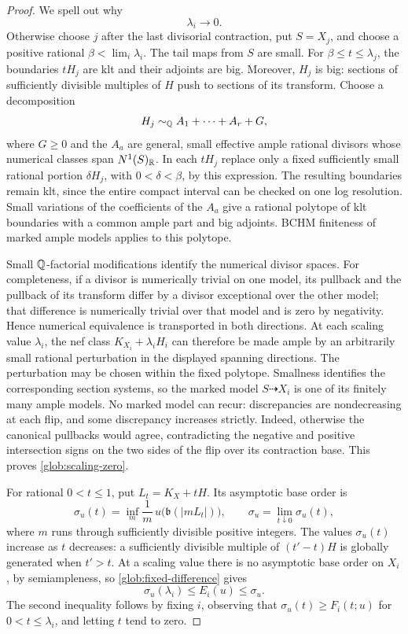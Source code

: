 \begin{proof}
We spell out why
\begin{equation}\label{glob:scaling-zero}
 \lambda_i\longrightarrow0.
\end{equation}
Otherwise choose $j$ after the last divisorial contraction, put $S=X_j$,
and choose a positive rational $\beta<\lim_i\lambda_i$.  The tail maps
from $S$ are small.  For $\beta\leq t\leq\lambda_j$, the boundaries $tH_j$
are klt and their adjoints are big.  Moreover, $H_j$ is big: sections of
sufficiently divisible multiples of $H$ push to sections of its transform.
Choose a decomposition
\[
 H_j\sim_\mathbb Q A_1+\cdots+A_r+G,
\]
where $G\geq0$ and the $A_a$ are general, small effective ample rational
divisors whose numerical classes span $N^1(S)_\mathbb R$.  In each $tH_j$ replace
only a fixed sufficiently small rational portion $\delta H_j$, with
$0<\delta<\beta$, by this expression.  The resulting boundaries remain
klt, since the entire compact interval can be checked on one log
resolution.  Small variations of the coefficients of the $A_a$ give a
rational polytope of klt boundaries with a common ample part and big
adjoints.  BCHM finiteness of marked ample models
\cite[Corollary~1.1.5]{BCHM} applies to this polytope.

Small $\mathbb Q$-factorial modifications identify the numerical divisor spaces.
For completeness, if a divisor is numerically trivial on one model, its
pullback and the pullback of its transform differ by a divisor exceptional
over the other model; that difference is numerically trivial over that
model and is zero by negativity.  Hence numerical equivalence is
transported in both directions.  At each scaling value $\lambda_i$, the
nef class $K_{X_i}+\lambda_iH_i$ can therefore be made ample by an
arbitrarily small rational perturbation in the displayed spanning
directions.  The perturbation may be chosen within the fixed polytope.
Smallness identifies the corresponding section systems, so the marked
model $S\dashrightarrow X_i$ is one of its finitely many ample models.
No marked model can recur: discrepancies are nondecreasing at each flip,
and some discrepancy increases strictly.  Indeed, otherwise the canonical
pullbacks would agree, contradicting the negative and positive
intersection signs on the two sides of the flip over its contraction
base.  This proves \eqref{glob:scaling-zero}.

For rational $0<t\leq1$, put $L_t=K_X+tH$.  Its asymptotic base order is
\[
 \sigma_u(t)=\inf_m\frac{1}{m}\,
 u\bigl(\mathfrak b(|mL_t|)\bigr),
 \qquad \sigma_u=\lim_{t\downarrow0}\sigma_u(t),
\]
where $m$ runs through sufficiently divisible positive integers.  The
values $\sigma_u(t)$ increase as $t$ decreases: a sufficiently divisible
multiple of $(t'-t)H$ is globally generated when $t'>t$.  At a scaling
value there is no asymptotic base order on $X_i$, by semiampleness, so
\eqref{glob:fixed-difference} gives
\begin{equation}\label{glob:sigma-squeeze}
 \sigma_u(\lambda_i)\leq E_i(u)\leq\sigma_u.
\end{equation}
The second inequality follows by fixing $i$, observing that
$\sigma_u(t)\geq F_i(t;u)$ for $0<t\leq\lambda_i$, and letting $t$ tend
to zero.


\end{proof}
